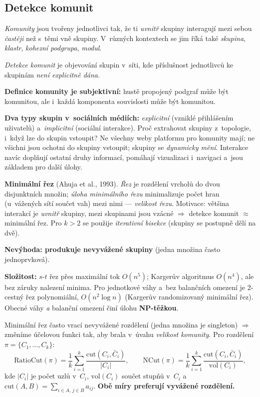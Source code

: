 \documentclass[11pt,a4paper]{article}
\theoremstyle{definition}
\begin{document}
\subsection{Detekce komunit}

\begin{defbox}
\emph{Komunity} jsou tvořeny jednotlivci tak, že ti \emph{uvnitř} skupiny interagují mezi
sebou \emph{častěji} než s~těmi vně skupiny. V~různých kontextech se jim říká také
\emph{skupina}, \emph{klastr}, \emph{kohezní podgrupa}, \emph{modul}.

\emph{Detekce komunit} je objevování skupin v~síti, kde příslušnost jednotlivců ke skupinám
\emph{není explicitně dána}.

\textbf{Definice komunity je subjektivní:} hustě propojený podgraf může být komunitou, ale
i~každá komponenta souvislosti může být komunitou.

\textbf{Dva typy skupin v~sociálních médiích:} \emph{explicitní} (vzniklé přihlášením
uživatelů) a~\emph{implicitní} (sociální interakce). Proč extrahovat skupiny z~topologie, i~když lze do
skupin vstoupit? Ne všechny weby platformu pro komunity mají; ne všichni jsou ochotni do skupiny
vstoupit; skupiny se \emph{dynamicky mění}. Interakce navíc doplňují ostatní druhy informací,
pomáhají vizualizaci i~navigaci a~jsou základem pro další úlohy.
\end{defbox}

\begin{defbox}
\textbf{Minimální řez} (Ahuja et al., 1993). \emph{Řez} je rozdělení vrcholů do dvou
disjunktních množin; \emph{úloha minimálního řezu} minimalizuje počet hran (u~vážených sítí
součet vah) mezi nimi --- \emph{velikost řezu}. Motivace: většina interakcí je \emph{uvnitř}
skupiny, mezi skupinami jsou vzácné $\Rightarrow$ detekce komunit $\approx$ minimální řez. Pro
$k>2$ se použije \emph{iterativní bisekce} (skupiny se postupně dělí na dvě).

\textbf{Nevýhoda: produkuje nevyvážené skupiny} (jedna množina často jednoprvková).

\textbf{Složitost:} $s$-$t$ řez přes maximální tok $O(n^5)$; Kargerův algoritmus $O(n^4)$, ale
bez záruky nalezení minima. Pro jednotkové váhy a~bez balančních omezení je 2-cestný řez
polynomiální, $O(n^2\log n)$ (Kargerův randomizovaný minimální řez). Obecné váhy \emph{a}
balanční omezení činí úlohu \textbf{NP-těžkou}.
\end{defbox}

\begin{defbox}
Minimální řez často vrací nevyvážené rozdělení (jedna množina je singleton) $\Rightarrow$
změníme účelovou funkci tak, aby brala v~úvahu \emph{velikost komunity}. Pro rozdělení
$\pi=\{C_1,\dots,C_k\}$:
\[ \mathrm{RatioCut}(\pi)=\frac{1}{k}\sum_{i=1}^{k}\frac{\mathrm{cut}(C_i,\bar C_i)}{|C_i|},\qquad
   \mathrm{NCut}(\pi)=\frac{1}{k}\sum_{i=1}^{k}\frac{\mathrm{cut}(C_i,\bar C_i)}{\mathrm{vol}(C_i)}, \]
kde $|C_i|$ je počet uzlů v~$C_i$, $\mathrm{vol}(C_i)$ součet stupňů v~$C_i$
a~$\mathrm{cut}(A,B)=\sum_{i\in A,\,j\in B}a_{ij}$. \textbf{Obě míry preferují vyvážené
rozdělení.}
\end{defbox}
\end{document}
